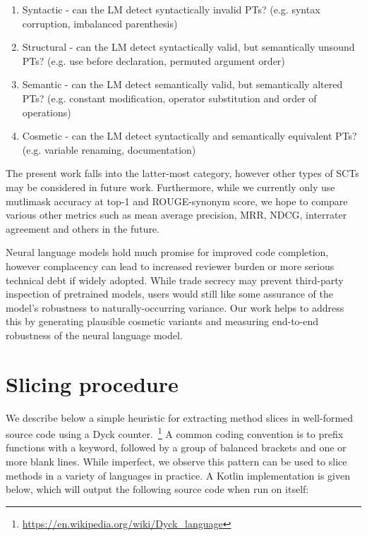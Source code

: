 \documentclass[sigconf,review,anonymous]{acmart}
\begin{document}
  \begin{enumerate}
    \item Syntactic - can the LM detect syntactically invalid PTs? (e.g. syntax corruption, imbalanced parenthesis)
    \item Structural - can the LM detect syntactically valid, but semantically unsound PTs? (e.g. use before declaration, permuted argument order)
    \item Semantic - can the LM detect semantically valid, but semantically altered PTs? (e.g. constant modification, operator substitution and order of operations)
    \item Cosmetic - can the LM detect syntactically and semantically equivalent PTs? (e.g. variable renaming, documentation)
  \end{enumerate}

  The present work falls into the latter-most category, however other types of SCTs may be considered in future work. Furthermore, while we currently only use mutlimask accuracy at top-1 and ROUGE-synonym score, we hope to compare various other metrics such as mean average precision, MRR, NDCG, interrater agreement and others in the future.

  Neural language models hold much promise for improved code completion, however complacency can lead to increased reviewer burden or more serious technical debt if widely adopted. While trade secrecy may prevent third-party inspection of pretrained models, users would still like some assurance of the model's robustness to naturally-occurring variance. Our work helps to address this by generating plausible cosmetic variants and measuring end-to-end robustness of the neural language model.
  \pagebreak
  
  \pagebreak
  \appendix

  \section{Slicing procedure}\label{sec:slicing}

  We describe below a simple heuristic for extracting method slices in well-formed source code using a Dyck counter.~\footnote{\url{https://en.wikipedia.org/wiki/Dyck\_language}} A common coding convention is to prefix functions with a keyword, followed by a group of balanced brackets and one or more blank lines. While imperfect, we observe this pattern can be used to slice methods in a variety of languages in practice. A Kotlin implementation is given below, which will output the following source code when run on itself:
\end{document}
